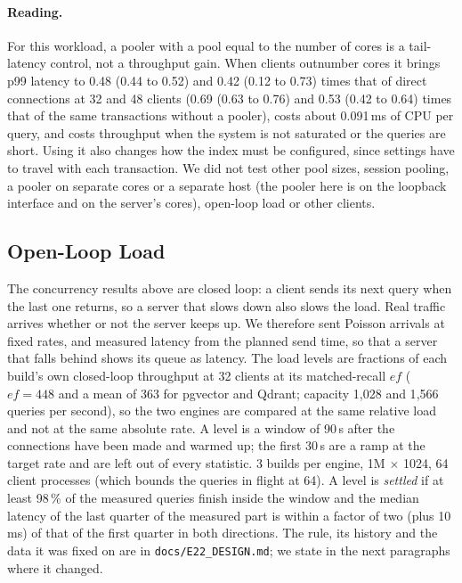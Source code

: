 \documentclass[sigconf, nonacm]{acmart}
\begin{document}
\paragraph{Reading.} For this workload, a pooler with a pool equal to the number of cores is a tail-latency control, not a
throughput gain. When clients outnumber cores it brings p99 latency to 0.48 (0.44 to 0.52) and 0.42 (0.12 to 0.73) times that of direct connections
at 32 and 48 clients (0.69 (0.63 to 0.76) and 0.53 (0.42 to 0.64) times that of the same transactions without a pooler), costs about
0.091\,ms of CPU per query, and costs throughput when the system is not saturated or the queries are short. Using it also changes how the index must be configured, since
settings have to travel with each transaction. We did not test other pool sizes, session pooling, a pooler on separate cores
or a separate host (the pooler here is on the loopback interface and on the server's cores), open-loop load or other clients.


\subsection{Open-Loop Load}
\label{sec:openloop}

The concurrency results above are closed loop: a client sends its next query when the last one returns, so a server that slows
down also slows the load. Real traffic arrives whether or not the server keeps up. We therefore sent Poisson arrivals at fixed rates,
and measured latency from the planned send time, so that a server that falls behind shows its queue as latency. The load levels are
fractions of each build's own closed-loop throughput at 32 clients at its matched-recall $ef$ ($ef=448$ and a mean of $363$ for
pgvector and Qdrant; capacity 1{,}028 and 1{,}566 queries per second), so the two engines are compared at the same relative load and
not at the same absolute rate. A level is a window of 90\,s after the connections have been made and warmed up; the first 30\,s are a ramp at the
target rate and are left out of every statistic. 3 builds per engine, 1M $\times$ 1024, 64 client processes (which bounds the
queries in flight at 64). A level is \emph{settled} if at least 98\,\% of the measured queries finish inside the window and the median
latency of the last quarter of the measured part is within a factor of two (plus 10\,ms) of that of the first quarter in both directions. The
rule, its history and the data it was fixed on are in \texttt{docs/E22\_DESIGN.md}; we state in the next paragraphs where it changed.
\end{document}
